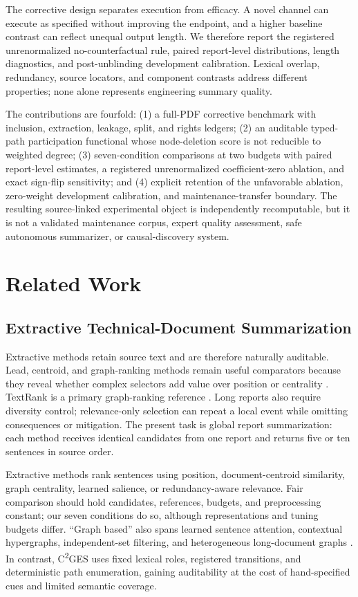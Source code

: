 \documentclass[applsci,article,submit,moreauthors]{Definitions/mdpi}
\newcommand{\cges}{C\textsuperscript{2}GES}
\begin{document}
The corrective design separates execution from efficacy. A novel channel can execute as specified without improving the endpoint, and a higher baseline contrast can reflect unequal output length. We therefore report the registered unrenormalized no-counterfactual rule, paired report-level distributions, length diagnostics, and post-unblinding development calibration. Lexical overlap, redundancy, source locators, and component contrasts address different properties; none alone represents engineering summary quality.

The contributions are fourfold: (1) a full-PDF corrective benchmark with inclusion, extraction, leakage, split, and rights ledgers; (2) an auditable typed-path participation functional whose node-deletion score is not reducible to weighted degree; (3) seven-condition comparisons at two budgets with paired report-level estimates, a registered unrenormalized coefficient-zero ablation, and exact sign-flip sensitivity; and (4) explicit retention of the unfavorable ablation, zero-weight development calibration, and maintenance-transfer boundary. The resulting source-linked experimental object is independently recomputable, but it is not a validated maintenance corpus, expert quality assessment, safe autonomous summarizer, or causal-discovery system.

\section{Related Work}

\subsection{Extractive Technical-Document Summarization}

Extractive methods retain source text and are therefore naturally auditable. Lead, centroid, and graph-ranking methods remain useful comparators because they reveal whether complex selectors add value over position or centrality \cite{zhong2020extractive,bi2021aredsum,liu2021unsupervised}. TextRank is a primary graph-ranking reference \cite{mihalcea2004textrank}. Long reports also require diversity control; relevance-only selection can repeat a local event while omitting consequences or mitigation. The present task is global report summarization: each method receives identical candidates from one report and returns five or ten sentences in source order.

Extractive methods rank sentences using position, document-centroid similarity, graph centrality, learned salience, or redundancy-aware relevance. Fair comparison should hold candidates, references, budgets, and preprocessing constant; our seven conditions do so, although representations and tuning budgets differ. ``Graph based'' also spans learned sentence attention, contextual hypergraphs, independent-set filtering, and heterogeneous long-document graphs \cite{siragusa2022sentencegraph,onan2024mches,hark2025mis,bugueno2025graphlss}. In contrast, \cges{} uses fixed lexical roles, registered transitions, and deterministic path enumeration, gaining auditability at the cost of hand-specified cues and limited semantic coverage.
\end{document}

